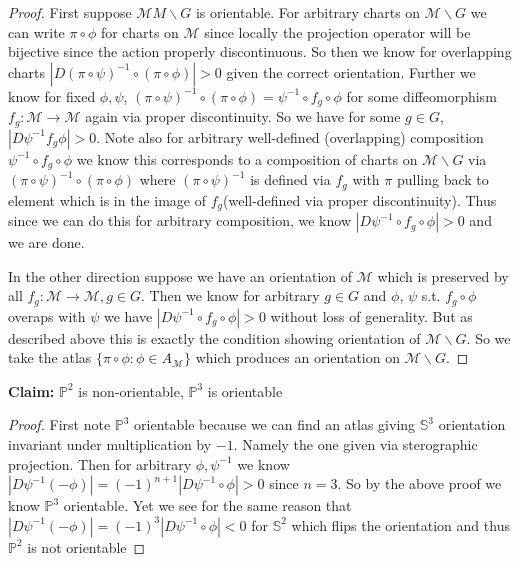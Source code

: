 \documentclass[11pt]{article}
\newcommand{\m}{\mathcal{M}}
\begin{document}
\begin{proof}

First suppose $\m M\backslash G$ is orientable. For arbitrary charts on $\m \backslash G$ we can write $\pi \circ \phi$ for charts on $\m$ since locally the projection operator will be bijective since the action properly discontinuous. So then we know for overlapping charts $|D(\pi \circ \psi)^{-1} \circ (\pi \circ \phi)| > 0$ given the correct orientation. Further we know for fixed $\phi, \psi$, $(\pi \circ \psi)^{-1} \circ (\pi \circ \phi) = \psi^{-1}\circ f_g \circ \phi$ for some diffeomorphism $f_g : \m \to \m$ again via proper discontinuity. So we have for some $g \in G$, $|D \psi^{-1} f_g \phi | > 0$. Note also for arbitrary well-defined (overlapping) composition $\psi^{-1} \circ f_g \circ \phi$ we know this corresponds to a composition of charts on $\m \backslash G$ via $(\pi \circ \psi)^{-1} \circ (\pi \circ \phi)$ where $(\pi \circ \psi)^{-1}$ is defined via $f_g$ with $\pi$ pulling back to element which is in the image of $f_g$(well-defined via proper discontinuity). Thus since we can do this for arbitrary composition, we know $|D\psi^{-1} \circ f_g \circ \phi| > 0$ and we are done.  


In the other direction suppose we have an orientation of $\m$ which is preserved by all $f_g : \m \to \m, g \in G$. Then we know for arbitrary $g \in G$ and $\phi$, $\psi$ s.t. $f_g \circ \phi$ overaps with $\psi$ we have $|D \psi^{-1}\circ f_g \circ \phi| > 0$ without loss of generality. But as described above this is exactly the condition showing orientation of $\m \backslash G$. So we take the atlas $\{\pi \circ \phi : \phi \in A_{\m}\}$ which produces an orientation on $\m \backslash G$.

\end{proof}

\textbf{Claim:} $\mathbb{P}^2$ is non-orientable, $\mathbb{P}^3$ is orientable

\begin{proof}

	First note $\mathbb{P}^3$ orientable because we can find an atlas giving $\mathbb{S}^3$ orientation invariant under multiplication by $-1$. Namely the one given via sterographic projection. Then for arbitrary $\phi, \psi^{-1}$ we know $|D \psi^{-1} (-\phi)| = (-1)^{n+1}|D\psi^{-1}\circ \phi| > 0$ since $n=3$. So by the above proof we know $\mathbb{P}^3$ orientable. Yet we see for the same reason that $|D\psi^{-1} (-\phi)| = (-1)^3|D\psi^{-1}\circ \phi| < 0$ for $\mathbb{S}^2$ which flips the orientation and thus $\mathbb{P}^2$ is not orientable


\end{proof}
\end{document}

